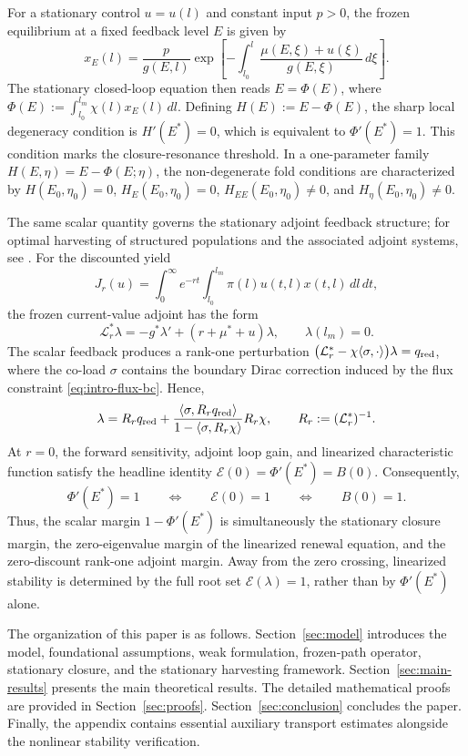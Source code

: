 \documentclass[pdflatex,sn-mathphys-num]{sn-jnl}
\theoremstyle{thmstyleone}
\theoremstyle{definition}
\theoremstyle{remark}
\numberwithin{equation}{section}
\begin{document}
For a stationary control $u=u(l)$ and constant input $p>0$, the frozen equilibrium at a fixed feedback level $E$ is given by
\[
x_E(l)=
\frac{p}{g(E,l)}
\exp\!\left[
-\int_{l_0}^{l}
\frac{\mu(E,\xi)+u(\xi)}{g(E,\xi)}\,d\xi
\right].
\]
The stationary closed-loop equation then reads $E=\Phi(E)$, where $\Phi(E):=\int_{l_0}^{l_m}\chi(l)x_E(l)\,dl$. Defining $H(E):=E-\Phi(E)$, the sharp local degeneracy condition is $H'(E^*)=0$, which is equivalent to $\Phi'(E^*)=1$. This condition marks the closure-resonance threshold. In a one-parameter family $H(E,\eta)=E-\Phi(E;\eta)$, the non-degenerate fold conditions are characterized by $H(E_0,\eta_0)=0$, $H_E(E_0,\eta_0)=0$, $H_{EE}(E_0,\eta_0)\ne0$, and $H_\eta(E_0,\eta_0)\ne0$.

The same scalar quantity governs the stationary adjoint feedback structure; for optimal harvesting of structured populations and the associated adjoint systems, see \cite{anita2013analysis,wang2025analysis}. For the discounted yield
\[
J_r(u)=
\int_0^\infty e^{-rt}
\int_{l_0}^{l_m}\pi(l)u(t,l)x(t,l)\,dl\,dt ,
\]
the frozen current-value adjoint has the form
\[
\mathcal{L}_r^*\lambda
=
-g^*\lambda'
+(r+\mu^*+u)\lambda,
\qquad
\lambda(l_m)=0 .
\]
The scalar feedback produces a rank-one perturbation $\big(\mathcal{L}_r^*-\chi\langle\sigma,\cdot\rangle\big)\lambda = q_{\rm red}$, where the co-load $\sigma$ contains the boundary Dirac correction induced by the flux constraint \eqref{eq:intro-flux-bc}. Hence,
\[
\lambda
=
R_r q_{\rm red}
+
\frac{\langle\sigma,R_r q_{\rm red}\rangle}
     {1-\langle\sigma,R_r\chi\rangle}
R_r\chi,
\qquad
R_r:=(\mathcal{L}_r^*)^{-1}.
\]
At $r=0$, the forward sensitivity, adjoint loop gain, and linearized characteristic function satisfy the headline identity $\mathcal{E}(0)=\Phi'(E^*)=B(0)$. Consequently,
\[
\Phi'(E^*)=1
\qquad\Longleftrightarrow\qquad
\mathcal{E}(0)=1
\qquad\Longleftrightarrow\qquad
B(0)=1 .
\]
Thus, the scalar margin $1-\Phi'(E^*)$ is simultaneously the stationary closure margin, the zero-eigenvalue margin of the linearized renewal equation, and the zero-discount rank-one adjoint margin. Away from the zero crossing, linearized stability is determined by the full root set $\mathcal{E}(\lambda)=1$, rather than by $\Phi'(E^*)$ alone.

The organization of this paper is as follows. Section~\ref{sec:model} introduces the model, foundational assumptions, weak formulation, frozen-path operator, stationary closure, and the stationary harvesting framework. Section~\ref{sec:main-results} presents the main theoretical results. The detailed mathematical proofs are provided in Section~\ref{sec:proofs}. Section~\ref{sec:conclusion} concludes the paper. Finally, the appendix contains essential auxiliary transport estimates alongside the nonlinear stability verification.
\end{document}
